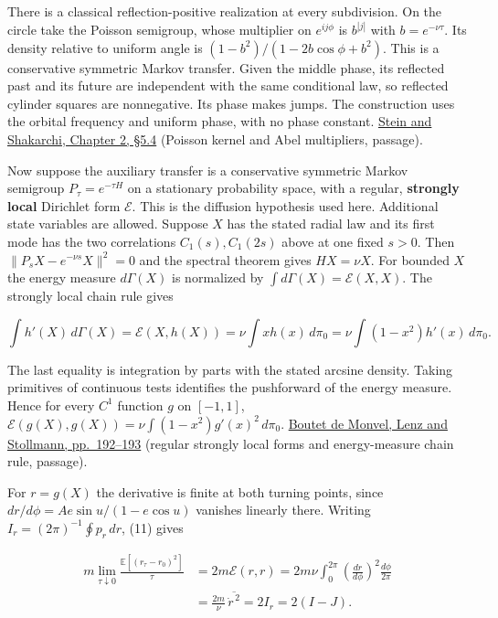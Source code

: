 \documentclass[11pt,a4paper]{article}
\begin{document}
There is a classical reflection-positive realization at every
subdivision. On the circle take the Poisson semigroup, whose multiplier
on \(e^{ij\phi}\) is \(b^{|j|}\) with \(b=e^{-\nu\tau}\). Its density
relative to uniform angle is \((1-b^2)/(1-2b\cos\phi+b^2)\). This is a
conservative symmetric Markov transfer. Given the middle phase, its
reflected past and its future are independent with the same conditional
law, so reflected cylinder squares are nonnegative. Its phase makes
jumps. The construction uses the orbital frequency and uniform phase,
with no phase constant.
\href{https://www.math.ru.nl/~mueger/Stein1.pdf}{Stein and Shakarchi,
Chapter 2, §5.4} (Poisson kernel and Abel multipliers, passage).

Now suppose the auxiliary transfer is a conservative symmetric Markov
semigroup \(P_\tau=e^{-\tau H}\) on a stationary probability space, with
a regular, \textbf{strongly local} Dirichlet form \(\mathcal E\). This
is the diffusion hypothesis used here. Additional state variables are
allowed. Suppose \(X\) has the stated radial law and its first mode has
the two correlations \(C_1(s),C_1(2s)\) above at one fixed \(s>0\). Then
\(\|P_sX-e^{-\nu s}X\|^2=0\) and the spectral theorem gives
\(HX=\nu X\). For bounded \(X\) the energy measure \(d\Gamma(X)\) is
normalized by \(\int d\Gamma(X)=\mathcal E(X,X)\). The strongly local
chain rule gives

\[
 \int h'(X)\,d\Gamma(X)
 =\mathcal E(X,h(X))
 =\nu\int xh(x)\,d\pi_0
 =\nu\int(1-x^2)h'(x)\,d\pi_0 .                                  \tag{11}
\]

The last equality is integration by parts with the stated arcsine
density. Taking primitives of continuous tests identifies the
pushforward of the energy measure. Hence for every \(C^1\) function
\(g\) on \([-1,1]\),
\(\mathcal E(g(X),g(X))=\nu\int(1-x^2)g'(x)^2\,d\pi_0\).
\href{https://www.tu-chemnitz.de/mathematik/analysis/preprints/schnol.pdf}{Boutet
de Monvel, Lenz and Stollmann, pp.~192--193} (regular strongly local
forms and energy-measure chain rule, passage).

For \(r=g(X)\) the derivative is finite at both turning points, since
\(dr/d\phi=Ae\sin u/(1-e\cos u)\) vanishes linearly there. Writing
\(I_r=(2\pi)^{-1}\oint p_r\,dr\), (11) gives

\[
 \begin{aligned}
 m\lim_{\tau\downarrow0}\frac{\mathbb E[(r_\tau-r_0)^2]}{\tau}
 &=2m\mathcal E(r,r)
 =2m\nu\int_0^{2\pi}\left(\frac{dr}{d\phi}\right)^2\frac{d\phi}{2\pi}\\
 &=\frac{2m}{\nu}\,\overline{\dot r^{\,2}}=2I_r=2(I-J).
 \end{aligned}                                                     \tag{12}
\]
\end{document}
